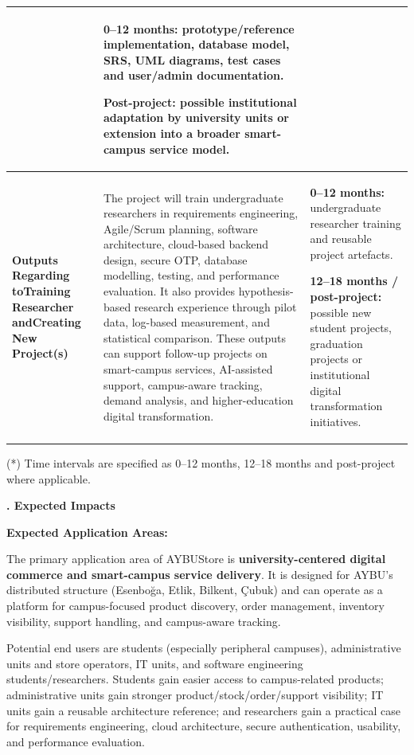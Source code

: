 \documentclass[10pt,a4paper]{article}
\newcommand{\subhead}[1]{\vspace{0.8em}\noindent\textbf{\fontsize{10}{11}\selectfont #1}\par\vspace{0.3em}}
\begin{document}
\begin{longtable}{|P{0.27\textwidth}|P{0.46\textwidth}|P{0.20\textwidth}|}
& \textbf{0--12 months:} prototype/reference implementation, database model, SRS, UML diagrams, test cases and user/admin documentation.\par \textbf{Post-project:} possible institutional adaptation by university units or extension into a broader smart-campus service model. \\ \hline
\textbf{Outputs Regarding to}\newline\textbf{Training Researcher and}\newline\textbf{Creating New Project(s)}
& The project will train undergraduate researchers in requirements engineering, Agile/Scrum planning, software architecture, cloud-based backend design, secure OTP, database modelling, testing, and performance evaluation. It also provides hypothesis-based research experience through pilot data, log-based measurement, and statistical comparison. These outputs can support follow-up projects on smart-campus services, AI-assisted support, campus-aware tracking, demand analysis, and higher-education digital transformation.
& \textbf{0--12 months:} undergraduate researcher training and reusable project artefacts.\par \textbf{12--18 months / post-project:} possible new student projects, graduation projects or institutional digital transformation initiatives. \\ \hline
\end{longtable}
\normalsize

{\small (*) Time intervals are specified as 0--12 months, 12--18 months and post-project where applicable.}

\subhead{4.2. Expected Impacts}

\textbf{Expected Application Areas:}

The primary application area of AYBUStore is \textbf{university-centered digital commerce and smart-campus service delivery}. It is designed for AYBU's distributed structure (Esenboğa, Etlik, Bilkent, Çubuk) and can operate as a platform for campus-focused product discovery, order management, inventory visibility, support handling, and campus-aware tracking.

Potential end users are students (especially peripheral campuses), administrative units and store operators, IT units, and software engineering students/researchers. Students gain easier access to campus-related products; administrative units gain stronger product/stock/order/support visibility; IT units gain a reusable architecture reference; and researchers gain a practical case for requirements engineering, cloud architecture, secure authentication, usability, and performance evaluation.
\end{document}

